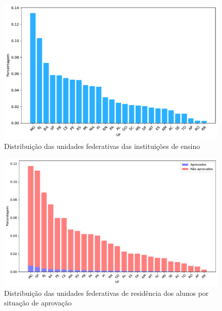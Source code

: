                     \begin{figure}[h]
                        \centering
                        \includegraphics[width=\textwidth]{figuras/distribuicao_ies.pdf} 
                        \caption{Distribuição das unidades federativas das instituições de ensino}
                        \label{fig:distribuicao-ies}
                    \end{figure}

                    
                    \begin{figure}[h]
                        \centering
                        \includegraphics[width=\textwidth]{figuras/distribuicao_residencia.pdf} 
                        \caption{Distribuição das unidades federativas de residência dos alunos por situação de aprovação}
                        \label{fig:distribuicao-residencia}
                    \end{figure}